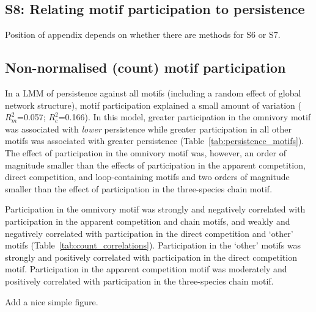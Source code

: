 \documentclass[12pt]{article}
\begin{document}
\begin{spacing}{2.0}
\section*{S8: Relating motif participation to persistence}
	
	Position of appendix depends on whether there are methods for S6 or S7.


	\subsection*{Non-normalised (count) motif participation}

		In a LMM of persistence against all motifs (including a random effect of global network structure), motif participation explained a small amount of variation ($R^{2}_m$=0.057; $R^2_c$=0.166).
		In this model, greater participation in the omnivory motif was associated with \emph{lower} persistence while greater participation in all other motifs was associated with greater persistence (Table~\ref{tab:persistence_motifs}).
		The effect of participation in the omnivory motif was, however, an order of magnitude smaller than the effects of participation in the apparent competition, direct competition, and loop-containing motifs and two orders of magnitude smaller than the effect of participation in the three-species chain motif.


		Participation in the omnivory motif was strongly and negatively correlated with participation in the apparent competition and chain motifs, and weakly and negatively correlated with participation in the direct competition and `other' motifs (Table~\ref{tab:count_correlations}).
		Participation in the `other' motifs was strongly and positively correlated with participation in the direct competition motif.
		Participation in the apparent competition motif was moderately and positively correlated with participation in the three-species chain motif.


		Add a nice simple figure.



\end{spacing}
\end{document}
